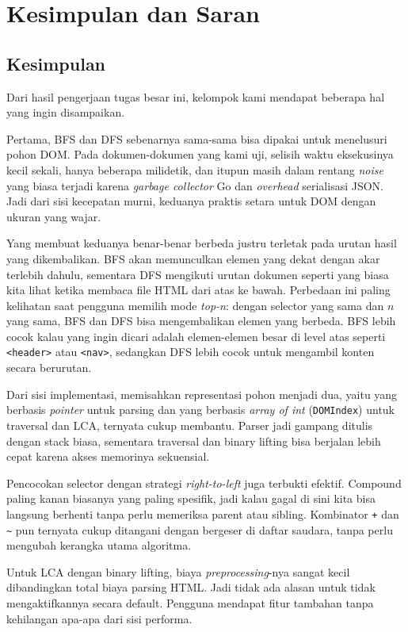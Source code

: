 \chapter{Kesimpulan dan Saran}

\section{Kesimpulan}

Dari hasil pengerjaan tugas besar ini, kelompok kami mendapat beberapa hal yang ingin disampaikan.

Pertama, BFS dan DFS sebenarnya sama-sama bisa dipakai untuk menelusuri pohon DOM. Pada dokumen-dokumen yang kami uji, selisih waktu eksekusinya kecil sekali, hanya beberapa milidetik, dan itupun masih dalam rentang \textit{noise} yang biasa terjadi karena \textit{garbage collector} Go dan \textit{overhead} serialisasi JSON. Jadi dari sisi kecepatan murni, keduanya praktis setara untuk DOM dengan ukuran yang wajar.

Yang membuat keduanya benar-benar berbeda justru terletak pada urutan hasil yang dikembalikan. BFS akan memunculkan elemen yang dekat dengan akar terlebih dahulu, sementara DFS mengikuti urutan dokumen seperti yang biasa kita lihat ketika membaca file HTML dari atas ke bawah. Perbedaan ini paling kelihatan saat pengguna memilih mode \textit{top-n}: dengan selector yang sama dan $n$ yang sama, BFS dan DFS bisa mengembalikan elemen yang berbeda. BFS lebih cocok kalau yang ingin dicari adalah elemen-elemen besar di level atas seperti \texttt{<header>} atau \texttt{<nav>}, sedangkan DFS lebih cocok untuk mengambil konten secara berurutan.

Dari sisi implementasi, memisahkan representasi pohon menjadi dua, yaitu yang berbasis \textit{pointer} untuk parsing dan yang berbasis \textit{array of int} (\texttt{DOMIndex}) untuk traversal dan LCA, ternyata cukup membantu. Parser jadi gampang ditulis dengan stack biasa, sementara traversal dan binary lifting bisa berjalan lebih cepat karena akses memorinya sekuensial.

Pencocokan selector dengan strategi \textit{right-to-left} juga terbukti efektif. Compound paling kanan biasanya yang paling spesifik, jadi kalau gagal di sini kita bisa langsung berhenti tanpa perlu memeriksa parent atau sibling. Kombinator \texttt{+} dan \texttt{\textasciitilde} pun ternyata cukup ditangani dengan bergeser di daftar saudara, tanpa perlu mengubah kerangka utama algoritma.

Untuk LCA dengan binary lifting, biaya \textit{preprocessing}-nya sangat kecil dibandingkan total biaya parsing HTML. Jadi tidak ada alasan untuk tidak mengaktifkannya secara default. Pengguna mendapat fitur tambahan tanpa kehilangan apa-apa dari sisi performa.

